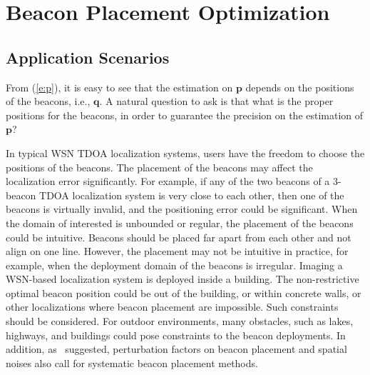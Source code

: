 \section{Beacon Placement Optimization}%
\subsection{Application Scenarios}
    From (\ref{e:p}), it is easy to see that the estimation on $\mathbf{p}$ depends on the positions of the beacons, i.e., $\mathbf{q}$. A natural question to ask is that what is the proper positions for the beacons, in order to guarantee the precision on the estimation of $\mathbf{p}$?



    In typical WSN TDOA localization systems, users have the freedom to choose the positions of the beacons. The placement of the beacons may affect the localization error significantly. For example, if any of the two beacons of a 3-beacon TDOA localization system is very close to each other, then one of the beacons is virtually invalid, and the positioning error could be significant.
        When the domain of interested is unbounded or regular, the placement of the beacons could be intuitive. Beacons should be placed far apart from each other and not align on one line. However, the placement may not be intuitive in practice, for example, when the deployment domain of the beacons is irregular. Imaging a WSN-based localization system is deployed inside a building. The non-restrictive optimal beacon position could be out of the building, or within concrete walls, or other localizations where beacon placement are impossible. Such constraints should be considered. For outdoor environments, many obstacles, such as lakes, highways, and buildings could pose constraints to the beacon deployments. In addition, as~\cite{bulusu01adaptive} suggested, perturbation factors on beacon placement and spatial noises also call for systematic beacon placement methods.


